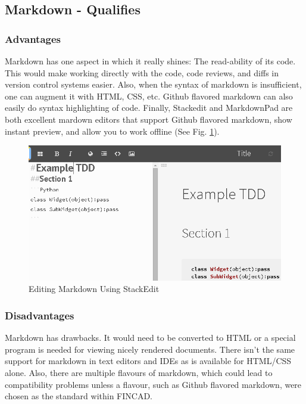 \documentclass[]{article}
\begin{document}
\subsection{Markdown - Qualifies}
	\subsubsection{Advantages}
	Markdown has one aspect in which it really shines: The read-ability of its code.  
	This would make working directly with the code, code reviews, and diffs in version control systems easier.  
	Also, when the syntax of markdown is insufficient, one can augment it with HTML, CSS, etc.  
	Github flavored markdown can also easily do syntax highlighting of code.  
	Finally, Stackedit and MarkdownPad are both excellent mardown editors that support Github flavored markdown, 
	show instant preview, and allow you to work offline (See Fig. \ref{StackEdit}).
	
	\begin{figure}[h]
		\centering
		\includegraphics[scale=.5]{StackEdit.png}
		\caption{Editing Markdown Using StackEdit}
		\label{StackEdit}
	\end{figure}
	
	\subsubsection{Disadvantages}
	Markdown has drawbacks. It would need to be converted to HTML or a special program is needed for viewing nicely rendered documents.  
	There isn't the same support for markdown in text editors and IDEs as is available for HTML/CSS alone.  
	Also, there are multiple flavours of markdown, which could lead to compatibility problems unless a flavour, 
	such as Github flavored markdown, were chosen as the standard within FINCAD.
\end{document}
